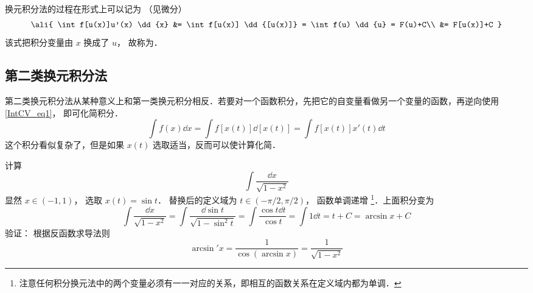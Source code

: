 换元积分法的过程在形式上可以记为 （见微分）
\begin{equation}\label{IntCV_eq1}
\ali{
\int f[u(x)]u'(x) \dd{x} &= \int f[u(x)] \dd{[u(x)]} = \int f(u) \dd{u} = F(u)+C\\
&= F[u(x)]+C
}\end{equation}
该式把积分变量由 $x$ 换成了 $u$， 故称为．

\subsection{第二类换元积分法}
第二类换元积分法从某种意义上和第一类换元积分相反．若要对一个函数积分，先把它的自变量看做另一个变量的函数，再逆向使用\autoref{IntCV_eq1}， 即可化简积分．
\begin{equation}\label{IntCV_eq6}
\int f(x) \dd{x} = \int f[x(t)] \dd{[x(t)]} = \int f[x(t)]x'(t) \dd{t}
\end{equation}
这个积分看似复杂了，但是如果 $x(t)$ 选取适当，反而可以使计算化简．

\begin{exam}{}
计算
\begin{equation}
\int \frac{\dd{x}}{\sqrt{1-x^2}}
\end{equation}
显然 $x \in ( - 1,1)$， 选取 $x(t)=\sin t$． 替换后的定义域为 $t \in ( -\pi/2,\pi/2)$， 函数单调递增 \footnote{注意任何积分换元法中的两个变量必须有一一对应的关系，即相互的函数关系在定义域内都为单调．}．上面积分变为
\begin{equation}
\int \frac{\dd{x}}{\sqrt{1-x^2}}  = \int \frac{\dd{\sin t}}{\sqrt{1-\sin^2 t}} = \int \frac{\cos t\dd{t}}{\cos t}  = \int 1\dd{t}  = t + C = \arcsin x + C
\end{equation}
验证： 根据反函数求导法则
\begin{equation}
\arcsin'x = \frac{1}{\cos(\arcsin x)} = \frac{1}{\sqrt {1 - {x^2}} }
\end{equation}
\end{exam}




